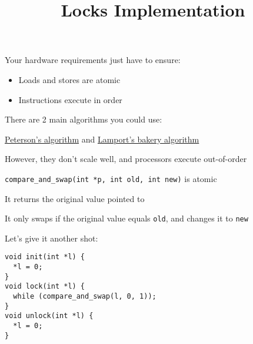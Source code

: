 

\title{Locks Implementation}


  \begin{frame}
    \titlepage
  \end{frame}

  \begin{slide}


    Your hardware requirements just have to ensure:
    \begin{itemize}
      \item Loads and stores are atomic
      \item Instructions execute in order
    \end{itemize}
    \medskip

    There are 2 main algorithms you could use:
    
    \leftspace{}\href{https://en.wikipedia.org/wiki/Peterson\%27s_algorithm}
    {Peterson's algorithm}
    and
    \href{http://en.wikipedia.org/wiki/Lamport\%27s_bakery_algorithm}
         {Lamport's bakery algorithm}
    \medskip

    However, they don't scale well, and processors execute
    out-of-order

  \end{slide}

  \begin{slide}


    \texttt{compare\_and\_swap(int *p, int old, int new)} is atomic

    \leftspace{}It returns the original value pointed to

    \leftspace{}It only swaps if the original value equals \texttt{old}, and changes it to \texttt{new}
    \medskip

    Let's give it another shot:

    \begin{verbatim}
void init(int *l) {
  *l = 0;
}
void lock(int *l) {
  while (compare_and_swap(l, 0, 1));
}
void unlock(int *l) {
  *l = 0;
}   
    \end{verbatim}

  \end{slide}

